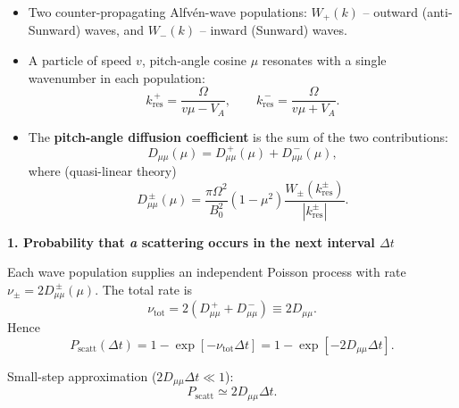 \begin{tcolorbox}[colback=white, colframe=black, title={Setup}]
\begin{itemize}
\item Two counter-propagating Alfvén-wave populations: 
$W_{+}(k)$ – outward (anti-Sunward) waves, and $W_{-}(k)$ – inward (Sunward) waves.
\item A particle of speed $v$, pitch-angle cosine $\mu$ resonates with a single wavenumber in each population:
\[
k_{\text{res}}^{\,+} = \frac{\Omega}{v\mu - V_A}, \qquad
k_{\text{res}}^{\,-} = \frac{\Omega}{v\mu + V_A}.
\]
\item The \textbf{pitch-angle diffusion coefficient} is the sum of the two contributions:
\[
D_{\mu\mu}(\mu) = D_{\mu\mu}^{\,+}(\mu) + D_{\mu\mu}^{\,-}(\mu),
\]
where (quasi-linear theory)
\[
D_{\mu\mu}^{\,\pm}(\mu) = \frac{\pi \Omega^{2}}{B_0^{2}} (1 - \mu^{2}) 
\frac{W_{\pm}\!\left(k_{\text{res}}^{\pm}\right)}{\left|k_{\text{res}}^{\pm}\right|}.
\]
\end{itemize}

\medskip

\textbf{1. Probability that \emph{a} scattering occurs in the next interval $\Delta t$}

Each wave population supplies an independent Poisson process with rate 
$\nu_{\pm} = 2 D_{\mu\mu}^{\,\pm}(\mu)$. The total rate is
\[
\nu_{\text{tot}} = 2\left(D_{\mu\mu}^{\,+} + D_{\mu\mu}^{\,-}\right) \equiv 2 D_{\mu\mu}.
\]
Hence
\begin{equation}
\boxed{
P_{\text{scatt}}(\Delta t) = 1 - \exp\left[-\nu_{\text{tot}} \Delta t\right] = 1 - \exp\left[-2 D_{\mu\mu} \Delta t\right]
}.
\tag{1}
\end{equation}

Small-step approximation ($2 D_{\mu\mu} \Delta t \ll 1$):
\[
P_{\text{scatt}} \simeq 2 D_{\mu\mu} \Delta t.
\]

\medskip

\end{tcolorbox}
